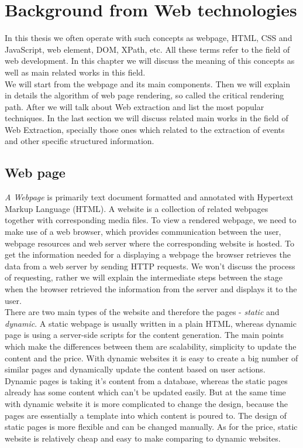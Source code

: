 \chapter{Background from Web technologies}
\label{chap:background}

In this thesis we often operate with such concepts as webpage, HTML, CSS and JavaScript, web element, DOM, XPath, etc. All these terms refer to the field of web development. In this chapter we will discuss the meaning of this concepts as well as main related works in this field.\\

We will start from the webpage and its main components. Then we will explain in details the algorithm of web page rendering, so called the critical rendering path. After we will talk about Web extraction and list the most popular techniques. In the last section we will discuss related main works in the field of Web Extraction, specially those ones which related to the extraction of events and other specific structured information.\\

\section{Web page}
\textit{A Webpage} is primarily text document formatted and annotated with Hypertext Markup Language (HTML). A website is a collection of related webpages together with corresponding media files. To view a rendered webpage, we need to make use of a web browser, which provides communication between the user, webpage resources and web server where the corresponding website is hosted. To get the information needed for a displaying a webpage the browser retrieves the data from a web server by sending HTTP requests. We won't discuss the process of requesting, rather we will explain the intermediate steps between the stage when the browser retrieved the information from the server and displays it to the user.\\ 

There are two main types of the website and therefore the pages - \textit{static} and \textit{dynamic}. A static webpage is usually written in a plain HTML, whereas dynamic page is using a server-side scripts for the content generation. The main points which make the differences between them are scalability, simplicity to update the content and the price. With dynamic websites it is easy to create a big number of similar pages and dynamically update the content based on user actions. Dynamic pages is taking it's content from a database, whereas the static pages already has some content which can't be updated easily. But at the same time with dynamic website it is more complicated to change the design, because the pages are essentially a template into which content is poured to. The design of static pages is more flexible and can be changed manually. As for the price, static website is relatively cheap and easy to make comparing to dynamic websites.\\ 

